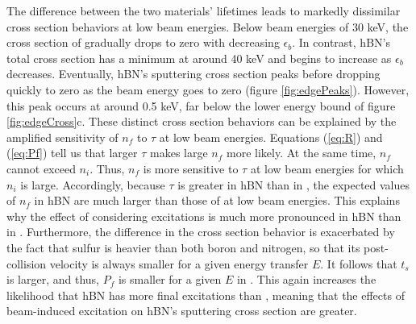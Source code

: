 \documentclass[twoside,twocolumn,9pt]{article}
\begin{document}
The difference between the two materials' lifetimes leads to markedly
dissimilar cross section behaviors at low beam energies.
Below beam energies of 30 keV, the cross section of  gradually drops to
zero with decreasing $\epsilon_b$.
In contrast, hBN's total cross section has a minimum at around 40 keV and
begins to increase as $\epsilon_b$ decreases.
Eventually, hBN's sputtering cross section peaks before dropping quickly to
zero as the beam energy goes to zero (figure \ref{fig:edgePeaks}).
However, this peak occurs at around 0.5 keV, far below the lower energy bound
of figure \ref{fig:edgeCross}c.
These distinct cross section behaviors can be explained by the amplified
sensitivity of $n_f$ to $\tau$ at low beam energies.
Equations (\ref{eq:R}) and (\ref{eq:Pf}) tell us that larger $\tau$
makes large $n_f$ more likely.
At the same time, $n_f$ cannot exceed $n_i$.
Thus, $n_f$ is more sensitive to $\tau$ at low beam energies for which $n_i$ is
large.
Accordingly, because $\tau$ is greater in hBN than in , the expected
values of $n_f$ in hBN are much larger than those of  at low beam
energies.
This explains why the effect of considering excitations is much more
pronounced in hBN than in .
Furthermore, the difference in the cross section behavior is exacerbated by the
fact that sulfur is heavier than both boron and nitrogen, so that its
post-collision velocity is always smaller for a given energy transfer $E$.
It follows that $t_s$ is larger, and thus, $P_f$ is smaller for a given $E$ in
.
This again increases the likelihood that hBN has more final excitations than
, meaning that the effects of beam-induced excitation on hBN's
sputtering cross section are greater.
\end{document}
